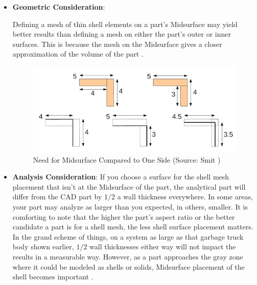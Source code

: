 \begin{itemize}[noitemsep,topsep=2pt,parsep=2pt,partopsep=2pt,leftmargin=*]
\begin{itemize}[noitemsep,topsep=2pt,parsep=2pt,partopsep=2pt,leftmargin=*]
\item \textbf{Geometric Consideration}:
	
Defining a mesh of thin shell elements on a part's Midsurface may yield better results than defining a mesh on either the part's outer or inner surfaces. This is because the mesh on the Midsurface  gives a closer approximation of the volume of the part \cite{SDRC2009}.
	


	\begin{figure} [!h]
		\centering
		\includegraphics[width=0.8\linewidth]{..//Common/images/OneSide}
		\caption{Need for Midsurface Compared to One Side (Source: Smit \cite{Smit2011})}
		\label{fig:litsurvey:oneside}
	\end{figure}
	


\item \textbf{Analysis Consideration}:
If you choose a surface for the shell mesh placement that isn't at the Midsurface of the part, the analytical part will differ from the CAD part by $1/2$  a wall thickness everywhere.  In some areas, your part may analyze as larger than you expected, in others, smaller.  It is comforting to note that the higher the part's aspect ratio or the better candidate a part is for a shell mesh, the less shell surface placement matters. In the grand scheme of things, on a system as large as that garbage truck body shown earlier, $1/2$   wall thicknesses either way will not impact the results in a measurable way. However, as a part approaches the gray zone where it could be modeled as shells or solids, Midsurface placement of the shell becomes important \cite{Cosmos2006}.
\end{itemize}


\end{itemize}
